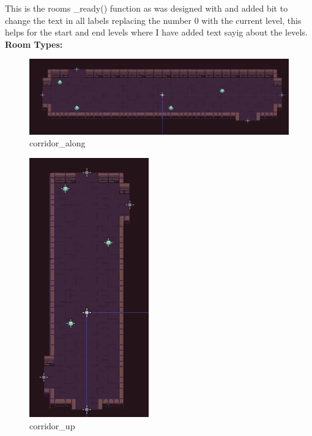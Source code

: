 \documentclass{article}
\begin{document}
        This is the rooms \_ready() function as was designed with and added bit to change the text in all labels replacing the number 0 with the current level, this helps for the start and end levels where I have added text sayig about the levels.\\
        \textbf{Room Types:}\\
        \begin{multicols}{3}
        \begin{figure}[H]
                \centering
                \includegraphics[width = \columnwidth]{images/development/Corridor_1.PNG}
                \caption{corridor\_along}
        \end{figure}
        \begin{figure}[H]
                \centering
                \includegraphics[width = 0.4\columnwidth]{images/development/Corridor_2.PNG}
                \caption{corridor\_up}
        \end{figure}
        \begin{figure}[H]
                \centering

\end{figure}
\end{multicols}
\end{document}
